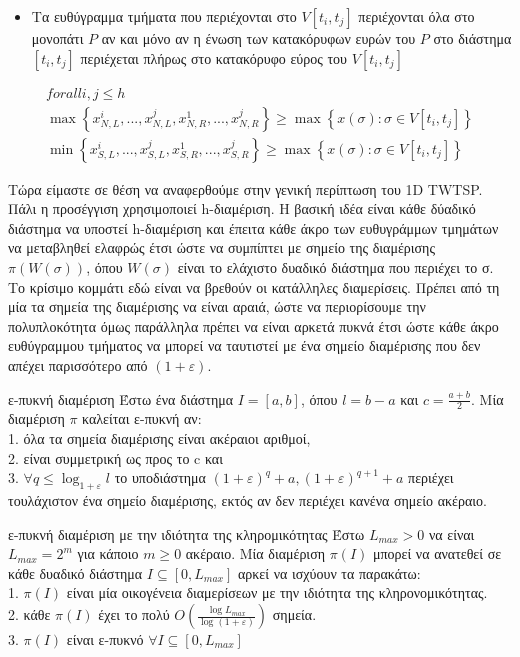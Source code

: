 \documentclass[oneside,12pt]{book}
\theoremstyle{definition}
\begin{document}
\begin{itemize}
	\item Τα ευθύγραμμα τμήματα που περιέχονται στο \(V[t_i, t_j]\) περιέχονται όλα στο μονοπάτι \(P\) αν και μόνο αν η ένωση των κατακόρυφων ευρών του \(P\) στο διάστημα \([t_i, t_j]\) περιέχεται πλήρως στο κατακόρυφο εύρος του \(V[t_i, t_j]\)
\end{itemize}

\begin{align*}
forall i,j \leq h \\
\max \left\{ x^{i}_{N,L},...,x^{j}_{N,L}, x^{1}_{N,R},...,x^{j}_{N,R} \right\} \geq \max \left\{ x(σ): σ \in V[t_i, t_j] \right\} \\
\min \left\{ x^{i}_{S,L},...,x^{j}_{S,L}, x^{1}_{S,R},...,x^{j}_{S,R} \right\} \geq \max \left\{ x(σ): σ \in V[t_i, t_j] \right\}
\end{align*}

Τώρα είμαστε σε θέση να αναφερθούμε στην γενική περίπτωση του 1D TWTSP. \\
Πάλι η προσέγγιση χρησιμοποιεί h-διαμέριση. Η βασική ιδέα είναι κάθε δύαδικό διάστημα να υποστεί h-διαμέριση και έπειτα κάθε άκρο των ευθυγράμμων τμημάτων να μεταβληθεί ελαφρώς έτσι ώστε να συμπίπτει με σημείο της διαμέρισης \(π(W(σ))\), όπου \(W(σ)\) είναι το ελάχιστο δυαδικό διάστημα που περιέχει το σ. \\
Το κρίσιμο κομμάτι εδώ είναι να βρεθούν οι κατάλληλες διαμερίσεις. Πρέπει από τη μία τα σημεία της διαμέρισης να είναι αραιά, ώστε να περιορίσουμε την πολυπλοκότητα όμως παράλληλα πρέπει να είναι αρκετά πυκνά έτσι ώστε κάθε άκρο ευθύγραμμου τμήματος να μπορεί να ταυτιστεί με ένα σημείο διαμέρισης που δεν απέχει παρισσότερο από \((1+ε)\). \\

\begin{mydefinition}{ε-πυκνή διαμέριση}{}
	Έστω ένα διάστημα \(I = [a,b]\), όπου \(l = b - a\) και \(c = \frac{a+b}{2}\). Μία διαμέριση \(π\) καλείται ε-πυκνή αν: \\
	1. όλα τα σημεία διαμέρισης είναι ακέραιοι αριθμοί, \\
	2. είναι συμμετρική ως προς το c και \\
	3. \(\forall q \leq \log_{1+ε} l\) το υποδιάστημα \((1+ε)^q + a, (1+ε)^{q+1} + a\) περιέχει τουλάχιστον ένα σημείο διαμέρισης, εκτός αν δεν περιέχει κανένα σημείο ακέραιο.
\end{mydefinition}

\begin{mylemma}{ε-πυκνή διαμέριση με την ιδιότητα της κληρομικότητας}{}
	Έστω \(L_{max} > 0\) να είναι \(L_{max} = 2^m\) για κάποιο \(m \geq 0\) ακέραιο. Μία διαμέριση \(π(I)\) μπορεί να ανατεθεί σε κάθε δυαδικό διάστημα \(I \subseteq [0,L_{max}]\) αρκεί να ισχύουν τα παρακάτω: \\
	1. \(π(Ι)\) είναι μία οικογένεια διαμερίσεων με την ιδιότητα της κληρονομικότητας. \\
	2. κάθε \(π(Ι)\) έχει το πολύ \(Ο(\frac{\log L_{max}}{\log (1+ε)})\) σημεία. \\
	3. \(π(Ι)\) είναι ε-πυκνό \(\forall I \subseteq [0,L_{max}]\)
\end{mylemma}
\end{document}
